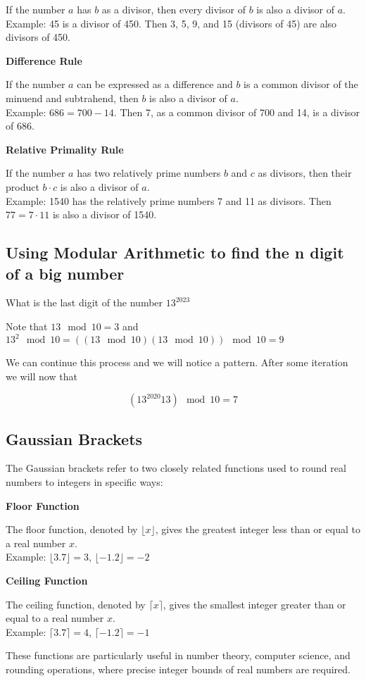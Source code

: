 If the number \( a \) has \( b \) as a divisor, then every divisor of \( b \) is also a divisor of \( a \). \\
Example: 45 is a divisor of 450. Then 3, 5, 9, and 15 (divisors of 45) are also divisors of 450.

\textbf{Difference Rule}

If the number \( a \) can be expressed as a difference and \( b \) is a common divisor of the minuend and subtrahend, then \( b \) is also a divisor of \( a \). \\
Example: \( 686 = 700 - 14 \). Then 7, as a common divisor of 700 and 14, is a divisor of 686.

\textbf{Relative Primality Rule}

If the number \( a \) has two relatively prime numbers \( b \) and \( c \) as divisors, then their product \( b \cdot c \) is also a divisor of \( a \). \\
Example: 1540 has the relatively prime numbers 7 and 11 as divisors. Then \( 77 = 7 \cdot 11 \) is also a divisor of 1540.

\subsection{Using Modular Arithmetic to find the n digit of a big number}

What is the last digit of the number \(13^{2023}\)

Note that \(13 \mod 10 = 3\) and  \(13^2 \mod 10 =  ((13 \mod 10)  (13\mod 10)) \mod 10 = 9 \)

We can continue this process and we will notice a pattern. After some iteration we will now that

\[(13^{2020} 13) \mod 10 = 7\]

\subsection{Gaussian Brackets}

The Gaussian brackets refer to two closely related functions used to round real numbers to integers in specific ways:

\textbf{Floor Function}

The floor function, denoted by \(\lfloor x \rfloor\), gives the greatest integer less than or equal to a real number \(x\). \\
    Example: \(\lfloor 3.7 \rfloor = 3\), \(\lfloor -1.2 \rfloor = -2\)

\textbf{Ceiling Function} 
    
The ceiling function, denoted by \(\lceil x \rceil\), gives the smallest integer greater than or equal to a real number \(x\). \\
    Example: \(\lceil 3.7 \rceil = 4\), \(\lceil -1.2 \rceil = -1\)

These functions are particularly useful in number theory, computer science, and rounding operations, where precise integer bounds of real numbers are required.

